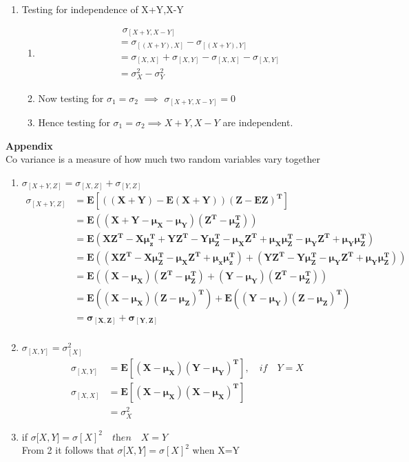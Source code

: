 \documentclass{article}
\begin{document}
\begin{enumerate}
\item \large{Testing for independence of X+Y,X-Y}
\begin{enumerate}
\item \begin{align*}
& \hspace{5pt} \sigma_{[X+Y, X-Y]}\\
&= \sigma_{[(X+Y), X]}- \sigma_{[(X+Y), Y]} \\
&= \sigma_{[X,X]} + \sigma_{[X,Y]} - \sigma_{[X,X]} - \sigma_{[X,Y]}  \\
&= \sigma_X^2 - \sigma_Y^2
\end{align*}

\item Now testing for $\sigma_1 = \sigma_2 $ $\implies$ $\sigma_{[X+Y,X-Y]}= 0$
\item Hence testing for   $\sigma_1 = \sigma_2 \implies X+Y, X-Y$ are independent.
\end{enumerate}
\end{enumerate}

\large \textbf{Appendix}\\
Co variance is a measure of how much two random variables vary together
\begin{enumerate}
    \item \large $\sigma_{[X+Y,Z]} = \sigma_{[X,Z]} + \sigma_{[Y,Z]}$
    \begin{align*}
        \sigma_{[X+Y,Z]} &= \mathbf{E[((X+Y) - E(X+Y)) (Z - EZ)^T ]}\\
        &= \mathbf{E((X+Y - \mu_{X}-\mu_{Y})  (Z^T -\mu_{Z}^T ))}\\
        &= \mathbf{E(XZ^T-X\mu_z^T + YZ^T - Y\mu_Z^T - \mu_X Z^T+ \mu_X\mu_Z^T-
        \mu_YZ^T+\mu_Y\mu_Z^T)}\\
        &= \mathbf{E((XZ^T-X\mu_Z^T-\mu_XZ^T+\mu_x\mu_z^T) + (YZ^T-Y\mu_Z^T-\mu_YZ^T+\mu_Y\mu_Z^T))}\\
        &= \mathbf{E((X-\mu_X)(Z^T-\mu_Z^T)+ (Y-\mu_Y)(Z^T-\mu_Z^T))}\\
        &= \mathbf{E((X-\mu_X)(Z-\mu_Z)^T) + E((Y-\mu_Y)(Z-\mu_Z)^T)}\\
        &=\mathbf{\sigma_{[X,Z]} + \sigma_{[Y,Z]}}\\
    \end{align*}
    
    \item \large  $ \sigma_{[X,Y]}= \sigma_{[X]}^2$\\
    \begin{align*}
        \sigma_{[X,Y]} &= \mathbf{E[(X-\mu_X) (Y-\mu_Y)^T]},
        \quad \textit{if}\quad Y=X \\
        \sigma_{[X,X]} &= \mathbf{E[(X-\mu_X) (X-\mu_X)^T]}\\
        &=\sigma_X^2
    \end{align*}
    
    \item if $\sigma{[X,Y}] = \sigma{[X]}^2 \quad \textit{then} \quad X=Y$\\
    From 2 it follows that  $\sigma{[X,Y}] = \sigma{[X]}^2$  when X=Y\\
\end{enumerate}
\end{document}
